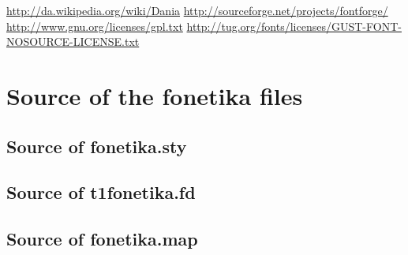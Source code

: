 \documentclass[a4paper,11pt,british,DIVcalc]{scrartcl}
\begin{document}
\begin{thebibliography}{9}
 \url{http://da.wikipedia.org/wiki/Dania}
 \url{http://sourceforge.net/projects/fontforge/}
 \url{http://www.gnu.org/licenses/gpl.txt}
 \url{http://tug.org/fonts/licenses/GUST-FONT-NOSOURCE-LICENSE.txt}
\end{thebibliography}
\appendix
\clearpage
\section{Source of the fonetika files}
\label{sec:source-fonet-files}

\subsection{Source of fonetika.sty}
\label{sec:source-fonetika.sty}


\subsection{Source of t1fonetika.fd}
\label{sec:source-t1fonetika.fd}


\subsection{Source of fonetika.map}
\label{sec:source-fonetika.map}

\end{document}
